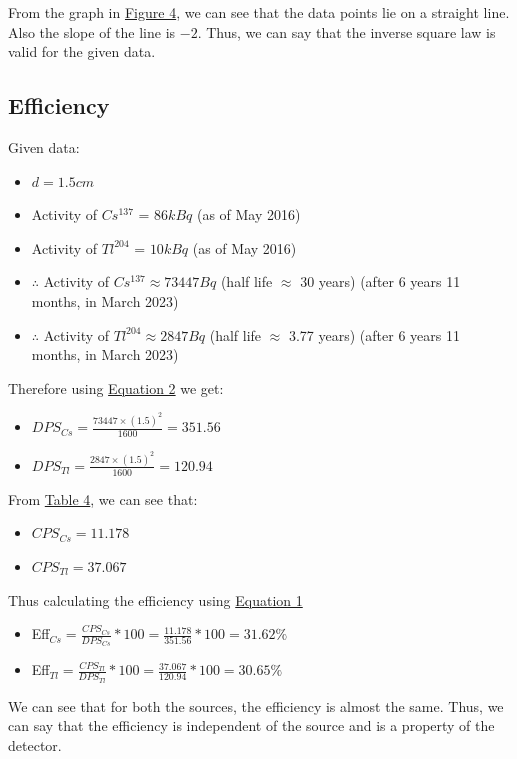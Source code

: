 		From the graph in \hyperref[graph:2]{Figure 4}, we can see that the data points lie on a straight line. Also the slope of the line is $-2$. Thus, we can say that the inverse square law is valid for the given data.


	\subsection{Efficiency}
		Given data:
		\begin{itemize}
			\item $d = 1.5cm$
			\item Activity of $Cs^{137}$ = $86 kBq$ (as of May 2016)
			\item Activity of $Tl^{204}$ = $10 kBq$ (as of May 2016)
			\item $\therefore$ Activity of $Cs^{137} \approx 73447 Bq$ (half life $\approx$ 30 years) (after 6 years 11 months, in March 2023)
			\item $\therefore$ Activity of $Tl^{204} \approx  2847 Bq$ (half life $\approx$ 3.77 years) (after 6 years 11 months, in March 2023)
		\end{itemize}

		Therefore using \hyperref[eq:2]{Equation 2} we get:
		\begin{itemize}
			\item $DPS_{Cs} = \frac{73447 \times (1.5)^2}{1600} = 351.56$
			\item $DPS_{Tl} = \frac{2847 \times (1.5)^2}{1600} = 120.94$
		\end{itemize}

		From \hyperref[tab:4]{Table 4}, we can see that:
		\begin{itemize}
			\item $CPS_{Cs} = 11.178$
			\item $CPS_{Tl} =  37.067$
		\end{itemize}

		Thus calculating the efficiency using \hyperref[eq:1]{Equation 1}
		\begin{itemize}
			\item Eff$_{Cs} = \frac{CPS_{Cs}}{DPS_{Cs}}*100 = \frac{11.178}{351.56}*100 = 31.62\%$
			\item Eff$_{Tl} = \frac{CPS_{Tl}}{DPS_{Tl}}*100 = \frac{37.067}{120.94}*100 = 30.65\%$
		\end{itemize}

		We can see that for both the sources, the efficiency is almost the same. Thus, we can say that the efficiency is independent of the source and is a property of the detector.
		

